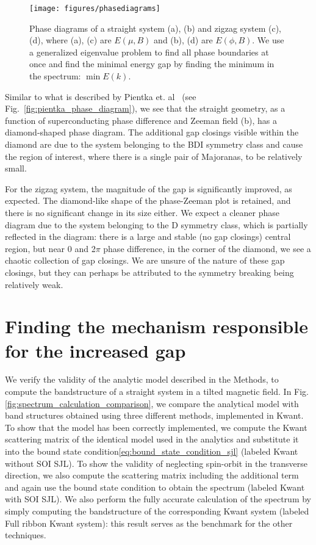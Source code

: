 			\begin{figure}[!htb]
			\centering
			\texttt{[image: figures/phasediagrams]}
			\caption{Phase diagrams of a straight system (a), (b) and zigzag system (c), (d), where (a), (c) are $E(\mu, B)$ and (b), (d) are $E(\phi, B)$.
			We use a generalized eigenvalue problem to find all phase boundaries at once and find the minimal energy gap by finding the minimum in the spectrum: $\min{E(k)}$.
			\label{fig:phasediagrams}}
			\end{figure}

			Similar to what is described by Pientka et. al~\cite{pientka2017topological} (see Fig.~\ref{fig:pientka_phase_diagram}), we see that the straight geometry, as a function of superconducting phase difference and Zeeman field (b), has a diamond-shaped phase diagram.
			The additional gap closings visible within the diamond are due to the system belonging to the BDI symmetry class and cause the region of interest, where there is a single pair of Majoranas, to be relatively small.
			
			For the zigzag system, the magnitude of the gap is significantly improved, as expected.
			The diamond-like shape of the phase-Zeeman plot is retained, and there is no significant change in its size either.
			We expect a cleaner phase diagram due to the system belonging to the D symmetry class, which is partially reflected in the diagram: there is a large and stable (no gap closings) central region, but near 0 and 2$\pi$ phase difference, in the corner of the diamond, we see a chaotic collection of gap closings.
			We are unsure of the nature of these gap closings, but they can perhaps be attributed to the symmetry breaking being relatively weak.



	\section{Finding the mechanism responsible for the increased gap}
		We verify the validity of the analytic model described in the Methods, to compute the bandstructure of a straight system in a tilted magnetic field.
		In Fig.\ref{fig:spectrum_calculation_comparison}, we compare the analytical model with band structures obtained using three different methods, implemented in Kwant.
		To show that the model has been correctly implemented, we compute the Kwant scattering matrix of the identical model used in the analytics and substitute it into the bound state condition\eqref{eq:bound_state_condition_sjl} (labeled Kwant without SOI SJL).
		To show the validity of neglecting spin-orbit in the transverse direction, we also compute the scattering matrix including the additional term and again use the bound state condition to obtain the spectrum (labeled Kwant with SOI SJL).
		We also perform the fully accurate calculation of the spectrum by simply computing the bandstructure of the corresponding Kwant system (labeled Full ribbon Kwant system): this result serves as the benchmark for the other techniques.

